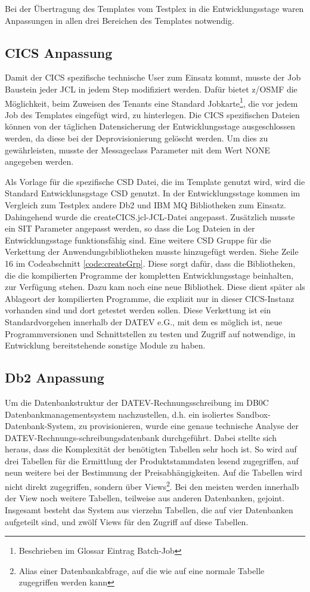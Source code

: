 Bei der Übertragung des Templates vom Testplex in die Entwicklungsstage waren Anpassungen in allen drei Bereichen des Templates notwendig.

\subsection{CICS Anpassung}\label{ssec:cicsentw}
Damit der CICS spezifische technische User zum Einsatz kommt, musste der \glqq Job\grqq{} Baustein jeder JCL in jedem Step modifiziert werden.
Dafür bietet z/OSMF die Möglichkeit, beim Zuweisen des Tenants eine Standard Jobkarte\footnote{Beschrieben im Glossar Eintrag \Gls{Batch-Job}}, die vor jedem Job des Templates eingefügt wird, zu hinterlegen.
Die CICS spezifischen Dateien können von der täglichen Datensicherung der Entwicklungsstage ausgeschlossen werden, da diese bei der Deprovisionierung gelöscht werden.
Um dies zu gewährleisten, musste der Messageclass Parameter mit dem Wert  \glqq NONE\grqq{} angegeben werden.

Als Vorlage für die spezifische CSD Datei, die im Template genutzt wird, wird die Standard Entwicklunsgstage CSD genutzt.
In der Entwicklungsstage kommen im Vergleich zum Testplex andere Db2 und IBM MQ Bibliotheken zum Einsatz.
Dahingehend wurde die \glqq createCICS.jcl\grqq-JCL-Datei angepasst.
Zusätzlich musste ein SIT Parameter angepasst werden, so dass die Log Dateien in der Entwicklungsstage funktionsfähig sind.
Eine weitere CSD Gruppe für die Verkettung der Anwendungsbibliotheken musste hinzugefügt werden.
Siehe Zeile 16 im Codeabschnitt \ref{code:createGrp}.
Diese sorgt dafür, dass die Bibliotheken, die die kompilierten Programme der kompletten Entwicklungsstage beinhalten, zur Verfügung stehen. 
Dazu kam noch eine neue Bibliothek.
Diese dient später als Ablageort der kompilierten Programme, die explizit nur in dieser CICS-Instanz vorhanden sind und dort getestet werden sollen.
Diese Verkettung ist ein Standardvorgehen innerhalb der DATEV e.G., mit dem es möglich ist, neue Programmversionen und Schnittstellen zu testen und Zugriff auf notwendige, in Entwicklung bereitstehende sonstige Module zu haben.

\subsection{Db2 Anpassung}\label{ssec:db2entw}
Um die Datenbankstruktur der DATEV-Rechnungsschreibung im DB0C Datenbankmanagementsystem nachzustellen, d.h. ein isoliertes Sandbox-Datenbank-System, zu provisionieren, wurde eine genaue technische Analyse der DATEV-Rechnungs-schreibungsdatenbank durchgeführt.
Dabei stellte sich heraus, dass die Komplexität der benötigten Tabellen sehr hoch ist.
So wird auf drei Tabellen für die Ermittlung der Produktstammdaten lesend zugegriffen, auf neun weitere bei der Bestimmung der Preisabhängigkeiten.
Auf die Tabellen wird nicht direkt zugegriffen, sondern über Views\footnote{Alias einer Datenbankabfrage, auf die wie auf eine normale Tabelle zugegriffen werden kann}.
Bei den meisten werden innerhalb der View noch weitere Tabellen, teilweise aus anderen Datenbanken, gejoint.
Insgesamt besteht das System aus vierzehn Tabellen, die auf vier Datenbanken aufgeteilt sind, und zwölf Views für den Zugriff auf diese Tabellen.

